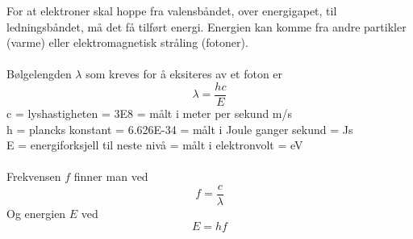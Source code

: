 For at elektroner skal hoppe fra valensbåndet,
over energigapet, til ledningsbåndet, må det få tilført energi.
Energien kan komme fra andre partikler (varme)
eller elektromagnetisk stråling (fotoner).
\\\\
Bølgelengden $\lambda$ som kreves for å eksiteres av et foton er
$$\lambda = \frac{h c}{E}$$
c = lyshastigheten = 3E8 = målt i meter per sekund m/s \\
h = plancks konstant = 6.626E-34 = målt i Joule ganger sekund = Js\\
E = energiforksjell til neste nivå = målt i elektronvolt = eV
\\\\
Frekvensen $f$ finner man ved
$$f = \frac{c}{\lambda}$$
Og energien $E$ ved
$$E = h f$$
